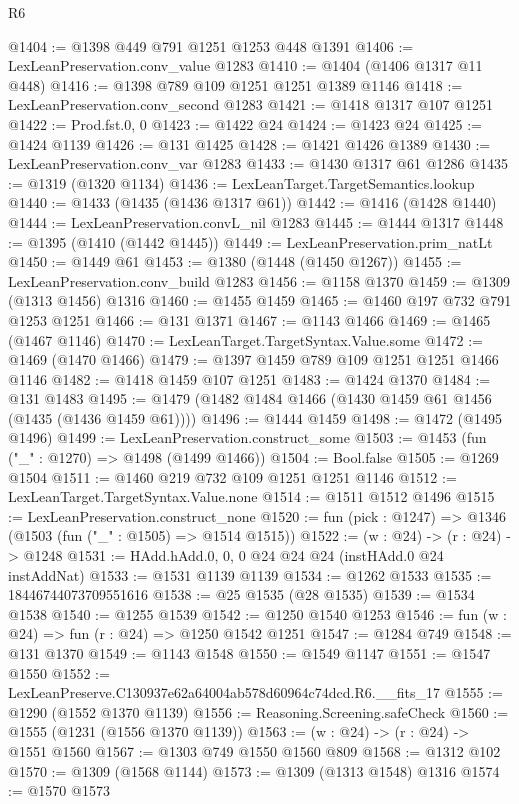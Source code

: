 \begin{lexlean}{R6}
\begin{coremodule}
@1404 := @1398 @449 @791 @1251 @1253 @448 @1391
@1406 := LexLeanPreservation.conv_value @1283
@1410 := @1404 (@1406 @1317 @11 @448)
@1416 := @1398 @789 @109 @1251 @1251 @1389 @1146
@1418 := LexLeanPreservation.conv_second @1283
@1421 := @1418 @1317 @107 @1251
@1422 := Prod.fst.{0, 0}
@1423 := @1422 @24
@1424 := @1423 @24
@1425 := @1424 @1139
@1426 := @131 @1425
@1428 := @1421 @1426 @1389
@1430 := LexLeanPreservation.conv_var @1283
@1433 := @1430 @1317 @61 @1286
@1435 := @1319 (@1320 @1134)
@1436 := LexLeanTarget.TargetSemantics.lookup
@1440 := @1433 (@1435 (@1436 @1317 @61))
@1442 := @1416 (@1428 @1440)
@1444 := LexLeanPreservation.convL_nil @1283
@1445 := @1444 @1317
@1448 := @1395 (@1410 (@1442 @1445))
@1449 := LexLeanPreservation.prim_natLt
@1450 := @1449 @61
@1453 := @1380 (@1448 (@1450 @1267))
@1455 := LexLeanPreservation.conv_build @1283
@1456 := @1158 @1370
@1459 := @1309 (@1313 @1456) @1316
@1460 := @1455 @1459
@1465 := @1460 @197 @732 @791 @1253 @1251
@1466 := @131 @1371
@1467 := @1143 @1466
@1469 := @1465 (@1467 @1146)
@1470 := LexLeanTarget.TargetSyntax.Value.some
@1472 := @1469 (@1470 @1466)
@1479 := @1397 @1459 @789 @109 @1251 @1251 @1466 @1146
@1482 := @1418 @1459 @107 @1251
@1483 := @1424 @1370
@1484 := @131 @1483
@1495 := @1479 (@1482 @1484 @1466 (@1430 @1459 @61 @1456 (@1435 (@1436 @1459 @61))))
@1496 := @1444 @1459
@1498 := @1472 (@1495 @1496)
@1499 := LexLeanPreservation.construct_some
@1503 := @1453 (fun ("_" : @1270) => @1498 (@1499 @1466))
@1504 := Bool.false
@1505 := @1269 @1504
@1511 := @1460 @219 @732 @109 @1251 @1251 @1146
@1512 := LexLeanTarget.TargetSyntax.Value.none
@1514 := @1511 @1512 @1496
@1515 := LexLeanPreservation.construct_none
@1520 := fun (pick : @1247) => @1346 (@1503 (fun ("_" : @1505) => @1514 @1515))
@1522 := (w : @24) -> (r : @24) -> @1248
@1531 := HAdd.hAdd.{0, 0, 0} @24 @24 @24 (instHAdd.{0} @24 instAddNat)
@1533 := @1531 @1139 @1139
@1534 := @1262 @1533
@1535 := 18446744073709551616
@1538 := @25 @1535 (@28 @1535)
@1539 := @1534 @1538
@1540 := @1255 @1539
@1542 := @1250 @1540 @1253
@1546 := fun (w : @24) => fun (r : @24) => @1250 @1542 @1251
@1547 := @1284 @749
@1548 := @131 @1370
@1549 := @1143 @1548
@1550 := @1549 @1147
@1551 := @1547 @1550
@1552 := LexLeanPreserve.C130937e62a64004ab578d60964c74dcd.R6.__fits_17
@1555 := @1290 (@1552 @1370 @1139)
@1556 := Reasoning.Screening.safeCheck
@1560 := @1555 (@1231 (@1556 @1370 @1139))
@1563 := (w : @24) -> (r : @24) -> @1551 @1560
@1567 := @1303 @749 @1550 @1560 @809
@1568 := @1312 @102
@1570 := @1309 (@1568 @1144)
@1573 := @1309 (@1313 @1548) @1316
@1574 := @1570 @1573

\end{coremodule}
\end{lexlean}
